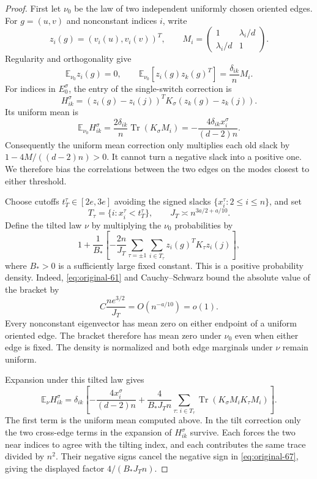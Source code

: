 \begin{proof}
First let $\nu_0$ be the law of two independent uniformly chosen oriented
edges.  For $g=(u,v)$ and nonconstant indices $i$, write
\[
 z_i(g)=(v_i(u),v_i(v))^T,\qquad
 M_i=\begin{pmatrix}1&\lambda_i/d\\ \lambda_i/d&1\end{pmatrix}.
\]
Regularity and orthogonality give
\[
 \mathbb E_{\nu_0}z_i(g)=0,\qquad
 \mathbb E_{\nu_0}[z_i(g)z_k(g)^T]=\frac{\delta_{ik}}n M_i.
\]
For indices in $E_0^\sigma$, the entry of the single-switch correction is
\[
 H_{ik}^\sigma=(z_i(g)-z_i(j))^TK_\sigma(z_k(g)-z_k(j)).
\]
Its uniform mean is
\[
 \mathbb E_{\nu_0}H_{ik}^\sigma
 =\frac{2\delta_{ik}}n\operatorname{Tr}(K_\sigma M_i)
 =-\frac{4\delta_{ik}x_i^\sigma}{(d-2)n}.
\]
Consequently the uniform mean correction only multiplies each old slack by
$1-4M/((d-2)n)>0$.  It cannot turn a negative slack into a positive one.
We therefore bias the correlations between the two edges on the modes
closest to either threshold.

Choose cutoffs $t_T^\tau\in[2e,3e]$ avoiding the signed slacks
$\{x_i^\tau:2\le i\le n\}$, and set
\[
 T_\tau=\{i:x_i^\tau<t_T^\tau\},\qquad
 J_T\asymp n^{3a/2+a/10}.
\]
Define the tilted law $\nu$ by multiplying the $\nu_0$ probabilities by
\begin{equation}
 1+\frac1{B_*}\left[-\frac{2n}{J_T}
       \sum_{\tau=\pm1}\sum_{i\in T_\tau}
       z_i(g)^TK_\tau z_i(j)\right],
 \label{eq:original-67}
\end{equation}
where $B_*>0$ is a sufficiently large fixed constant.
This is a positive probability density.  Indeed,
\eqref{eq:original-61} and Cauchy--Schwarz bound the absolute value of the
bracket by
\[
 C\frac{n e^{3/2}}{J_T}=O(n^{-a/10})=o(1).
\]
Every nonconstant eigenvector has mean zero on either endpoint of a uniform
oriented edge.  The bracket therefore has mean zero under $\nu_0$ even when
either edge is fixed.  The density is normalized and both edge marginals
under $\nu$ remain uniform.

Expansion under this tilted law gives
\begin{equation}
 \mathbb E_\nu H_{ik}^\sigma
 =\delta_{ik}\left[
 -\frac{4x_i^\sigma}{(d-2)n}
 +\frac4{B_*J_Tn}
   \sum_{\tau:\,i\in T_\tau}
      \operatorname{Tr}(K_\sigma M_iK_\tau M_i)
 \right].
 \label{eq:original-68}
\end{equation}
The first term is the uniform mean computed above.  In the tilt correction
only the two cross-edge terms in the expansion of $H_{ik}^\sigma$ survive.
Each forces the two near indices to agree with the tilting index, and each
contributes the same trace divided by $n^2$.  Their negative signs cancel
the negative sign in \eqref{eq:original-67}, giving the displayed factor
$4/(B_*J_Tn)$.


\end{proof}
